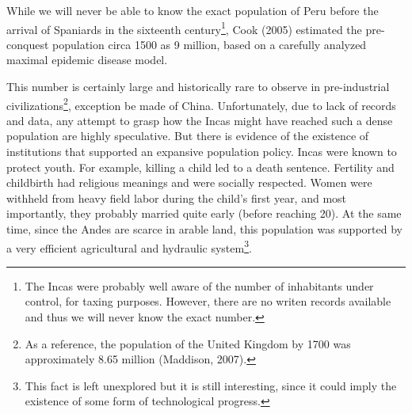 \documentclass[12pt]{article}%
\begin{document}
While we will never be able to know the exact population of Peru before the arrival of Spaniards in the sixteenth century\footnote{The Incas were probably well aware of the number of inhabitants under control, for taxing purposes. However, there are no writen records available and thus we will never know the exact number.}, Cook (2005) estimated the pre-conquest population circa 1500 as 9 million, based on a carefully analyzed maximal epidemic disease model.

This number is certainly large and historically rare to observe in pre-industrial civilizations\footnote{As a reference, the population of the United Kingdom by 1700 was approximately 8.65 million (Maddison, 2007).}, exception be made of China. Unfortunately, due to lack of records and data, any attempt to grasp how the Incas might have reached such a dense population are highly speculative. But there is evidence of the existence of institutions that supported an expansive population policy. Incas were known to protect youth. For example, killing a child led to a death sentence. Fertility and childbirth had religious meanings and were socially respected. Women were withheld from heavy field labor during the child's first year, and most importantly, they probably married quite early (before reaching 20). At the same time, since the Andes are scarce in arable land, this population was supported by a very efficient agricultural and hydraulic system\footnote{This fact is left unexplored but it is still interesting, since it could imply the existence of some form of technological progress.}.
\end{document}
